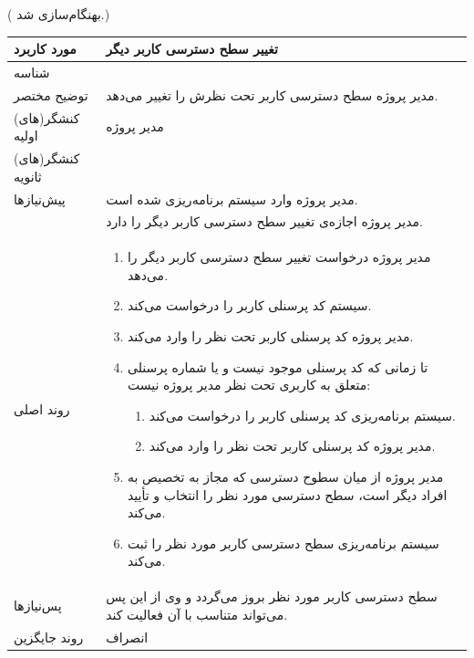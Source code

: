 ({\color{red} بهنگام‌سازی شد.})
\begin{table}[H]
	\centering
	\begin{tabular}{|p{3cm}|p{10cm}|}
		\hline
		مورد کاربرد & تغییر سطح دسترسی کاربر دیگر  \\
		\hline
		شناسه & 
		\stepcounter{usecase_ID}
		\arabic{usecase_ID} \\
		\hline
		توضیح مختصر & مدیر پروژه سطح دسترسی کاربر تحت نظرش را تغییر می‌دهد. \\
		\hline
		کنشگر(های) اولیه & مدیر پروژه \\
		\hline
		کنشگر(های) ثانویه &  \\
		\hline
		پیش‌نیازها & مدیر پروژه وارد سیستم برنامه‌ریزی شده است. \\
				& مدیر پروژه اجازه‌ی تغییر سطح دسترسی کاربر دیگر را دارد.\\
		\hline
		
		روند اصلی &
		\begin{enumerate}[topsep=0cm,leftmargin=0.5cm]
			\item مدیر پروژه درخواست تغییر سطح دسترسی کاربر دیگر را می‌دهد.
			\item سیستم کد پرسنلی کاربر را درخواست می‌کند.
			\item مدیر پروژه کد پرسنلی کاربر تحت نظر را وارد می‌کند. 
			\item تا زمانی که کد پرسنلی موجود نیست و یا شماره پرسنلی متعلق به کاربری تحت نظر مدیر پروژه نیست:
			\begin{enumerate}[topsep=0cm,leftmargin=0.5cm]
				\item سیستم برنامه‌ریزی کد پرسنلی کاربر را درخواست می‌کند.
				\item مدیر پروژه کد پرسنلی کاربر تحت نظر را وارد می‌کند.
			\end{enumerate}
			\item مدیر پروژه از میان سطوح دسترسی که مجاز به تخصیص به افراد دیگر است، سطح دسترسی مورد نظر را انتخاب و تأ‌یید می‌کند.
			\item سیستم برنامه‌ریزی سطح دسترسی کاربر مورد نظر را ثبت می‌کند.
		\end{enumerate} \\
		
		\hline
		پس‌نیازها & سطح دسترسی کاربر مورد نظر بروز می‌گردد و وی از این پس می‌تواند متناسب با آن فعالیت کند. \\
		\hline
		روند جایگزین & انصراف \\
		\hline
	\end{tabular}
\end{table}



